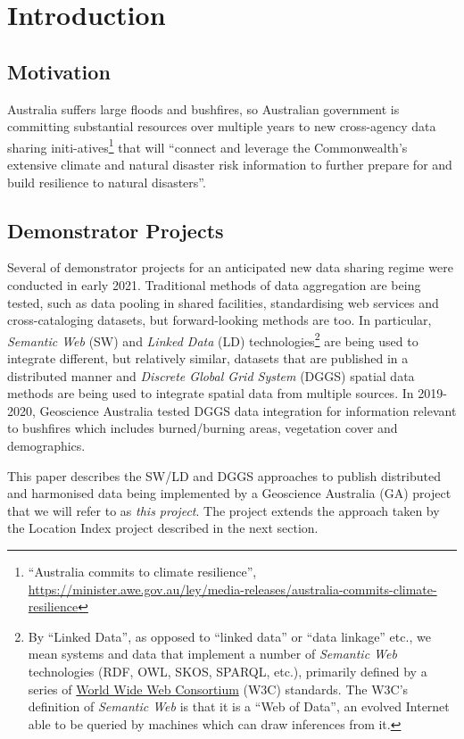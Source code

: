 \documentclass[runningheads]{llncs}
\begin{document}
\section{Introduction}\label{sec:introduction}
\subsection{Motivation}
Australia suffers large floods and bushfires, so Australian government is committing substantial resources over 
multiple years to new cross-agency data sharing initi-atives\footnote{``Australia commits to climate resilience'', 
\url{https://minister.awe.gov.au/ley/media-releases/australia-commits-climate-resilience}}
that will ``connect and leverage the Commonwealth’s extensive climate and natural disaster risk information to further prepare for and build resilience to natural disasters''.

\subsection{Demonstrator Projects}
Several of demonstrator projects for an anticipated new data sharing regime were conducted in early 2021. 
Traditional methods of data aggregation are being tested, such as data pooling in shared facilities,
standardising web services and cross-cataloging datasets, but forward-looking methods are too. In particular,
\textit{Semantic Web} (SW) and \textit{Linked Data} (LD) technologies\footnote{By ``Linked Data'', as opposed to ``linked data'' or ``data linkage'' etc.,
we mean systems and data that implement a number of \textit{Semantic Web} technologies (RDF, OWL, SKOS, SPARQL, etc.), primarily 
defined by a series of \href{https://www.w3.org/standards/semanticweb/data}{World Wide Web Consortium} (W3C) standards. The W3C's definition of 
\textit{Semantic Web} is that it is a ``Web of Data'', an evolved Internet able to be queried by machines which can draw inferences from it.}
are being used to integrate different, but relatively similar, datasets that are published in a distributed manner and
\textit{Discrete Global Grid System} (DGGS) spatial data methods are being used to integrate spatial data from multiple sources. In 2019-2020, Geoscience Australia tested DGGS data integration
for information relevant to bushfires which includes burned/burning areas, vegetation cover and demographics.

This paper describes the SW/LD and DGGS approaches to publish distributed and harmonised data being implemented by a Geoscience Australia (GA) project that we will 
refer to as \textit{this project}. The project extends the approach taken by the Location Index project described in the next section.
\end{document}
